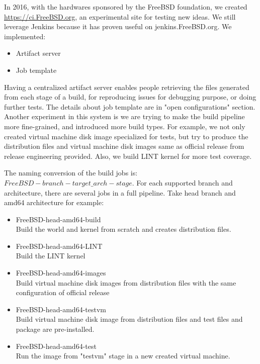 \documentclass[a4paper,twocolumn,10pt]{article}
\begin{document}
In 2016, with the hardwares sponsored by the FreeBSD foundation, we created
\url{https://ci.FreeBSD.org}, an experimental site for testing new ideas. We
still leverage Jenkins because it has proven useful on jenkins.FreeBSD.org. We
implemented:

\begin{itemize}
\item Artifact server
\item Job template
\end{itemize}

Having a centralized artifact server enables people retrieving the files
generated from each stage of a build, for reproducing issues for debugging
purpose, or doing further tests. The details about job template are in "open
configurations" section. Another experiment in this system is we are trying to
make the build pipeline more fine-grained, and introduced more build types. For
example, we not only created virtual machine disk image specialized for tests,
but try to produce the distribution files and virtual machine disk images same
as official release from release engineering provided. Also, we build LINT
kernel for more test coverage.

The naming conversion of the build jobs is:
$FreeBSD-{branch}-{target\_arch}-{stage}$. For each supported branch and
architecture, there are several jobs in a full pipeline.  Take head branch and
amd64 architecture for example:

\begin{itemize}
\item FreeBSD-head-amd64-build\\
  Build the world and kernel from scratch and creates distribution files.
\item FreeBSD-head-amd64-LINT\\
  Build the LINT kernel
\item FreeBSD-head-amd64-images\\
  Build virtual machine disk images from distribution files with the same configuration of official release
\item FreeBSD-head-amd64-testvm\\
  Build virtual machine disk image from distribution files and test files and package are pre-installed.
\item FreeBSD-head-amd64-test\\
  Run the image from "testvm" stage in a new created virtual machine.
\end{itemize}
\end{document}
